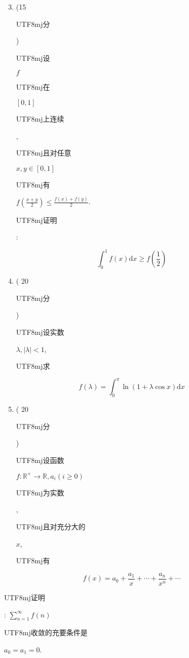 \documentclass[10pt]{article}
\begin{document}
\begin{enumerate}
  \setcounter{enumi}{2}
  \item (15 \begin{CJK}{UTF8}{mj}分\end{CJK}) \begin{CJK}{UTF8}{mj}设\end{CJK} $f$ \begin{CJK}{UTF8}{mj}在\end{CJK} $[0,1]$ \begin{CJK}{UTF8}{mj}上连续\end{CJK}, \begin{CJK}{UTF8}{mj}且对任意\end{CJK} $x, y \in[0,1]$ \begin{CJK}{UTF8}{mj}有\end{CJK} $f\left(\frac{x+y}{2}\right) \leqslant \frac{f(x)+f(y)}{2}$. \begin{CJK}{UTF8}{mj}证明\end{CJK}:
\end{enumerate}
$$
\int_{0}^{1} f(x) \mathrm{d} x \geqslant f\left(\frac{1}{2}\right)
$$

\begin{enumerate}
  \setcounter{enumi}{3}
  \item ( 20 \begin{CJK}{UTF8}{mj}分\end{CJK}) \begin{CJK}{UTF8}{mj}设实数\end{CJK} $\lambda,|\lambda|<1$, \begin{CJK}{UTF8}{mj}求\end{CJK}
\end{enumerate}
$$
f(\lambda)=\int_{0}^{\pi} \ln (1+\lambda \cos x) \mathrm{d} x
$$

\begin{enumerate}
  \setcounter{enumi}{4}
  \item ( 20 \begin{CJK}{UTF8}{mj}分\end{CJK}) \begin{CJK}{UTF8}{mj}设函数\end{CJK} $f: \mathbb{R}^{+} \rightarrow \mathbb{R}, a_{i}(i \geqslant 0)$ \begin{CJK}{UTF8}{mj}为实数\end{CJK}, \begin{CJK}{UTF8}{mj}且对充分大的\end{CJK} $x$, \begin{CJK}{UTF8}{mj}有\end{CJK}
\end{enumerate}
$$
f(x)=a_{0}+\frac{a_{1}}{x}+\cdots+\frac{a_{n}}{x^{n}}+\cdots
$$
\begin{CJK}{UTF8}{mj}证明\end{CJK}: $\sum_{n=1}^{\infty} f(n)$ \begin{CJK}{UTF8}{mj}收敛的充要条件是\end{CJK} $a_{0}=a_{1}=0$.
\end{document}
